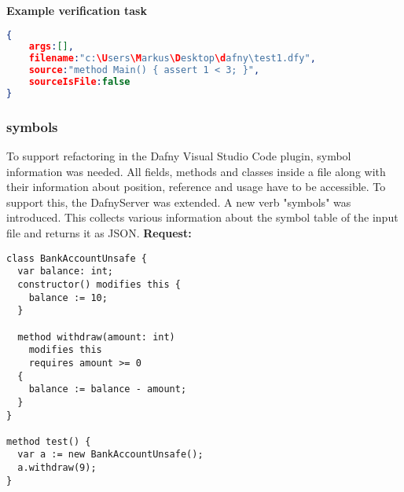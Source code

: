 \textbf{Example verification task}
\begin{lstlisting}[language=json,firstnumber=1]
{
	args:[],
	filename:"c:\Users\Markus\Desktop\dafny\test1.dfy",
	source:"method Main() {	assert 1 < 3; }",
	sourceIsFile:false
}

\end{lstlisting}

\subsubsection{symbols}
To support refactoring in the Dafny Visual Studio Code plugin, symbol information was needed. All fields, methods and classes inside a file along with their information about position, reference and usage have to be accessible. To support this, the DafnyServer was extended. A new verb "symbols" was introduced. This collects various information about the symbol table of the input file and returns it as JSON. 
\newline\newline
\textbf{Request: }

\begin{lstlisting}[language=dafny]
class BankAccountUnsafe {
  var balance: int;
  constructor() modifies this { 
    balance := 10;
  }
  
  method withdraw(amount: int) 
    modifies this
    requires amount >= 0
  {   
    balance := balance - amount; 
  } 
}   

method test() { 
  var a := new BankAccountUnsafe(); 
  a.withdraw(9);  
}   
\end{lstlisting}

